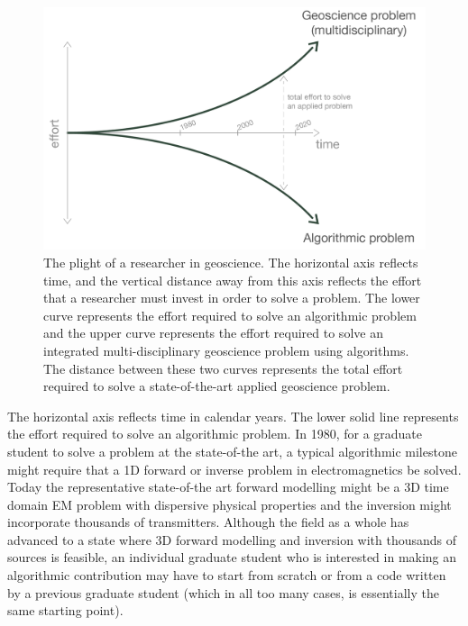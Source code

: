\documentclass[paper]{geophysics}
\begin{document}
\begin{figure}
    \begin{center}
    \includegraphics[width=0.8\columnwidth]{figures/diverging-curves-08.png}
    \end{center}
\caption{
    The plight of a researcher in geoscience. The horizontal axis reflects time, and the vertical distance away from this axis reflects the effort that a researcher must invest in order to solve a problem. The lower curve represents the effort required to solve an algorithmic problem and the upper curve represents the effort required to solve an integrated multi-disciplinary geoscience problem using algorithms. The distance between these two curves represents the total effort required to solve a state-of-the-art applied geoscience problem.
}
\label{fig:diverging-curves}
\end{figure}

The horizontal axis reflects time in calendar years. The lower solid line represents the effort required to solve an algorithmic problem. In 1980, for a graduate student to solve a problem at the state-of-the art, a typical algorithmic milestone might require that a 1D forward or inverse problem in electromagnetics be solved. Today the representative state-of-the art forward modelling might be a 3D time domain EM problem with dispersive physical properties and the inversion might incorporate thousands of transmitters. Although the field as a whole has advanced to a state where 3D forward modelling and inversion with thousands of sources is feasible, an individual graduate student who is interested in making an algorithmic contribution may have to start from scratch or from a code written by a previous graduate student (which in all too many cases, is essentially the same starting point).
\end{document}
